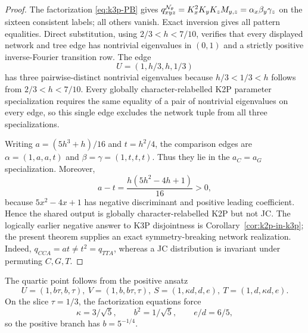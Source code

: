 \documentclass[11pt]{article}
\theoremstyle{remark}\newtheorem{remark}[theorem]{Remark}
\begin{document}
\begin{proof}
The factorization \eqref{eq:k3p-PB} gives $q^{\mathcal N_\theta}_{xyz}=K_x^2K_yK_zM_{y,z}=\alpha_x\beta_y\gamma_z$ on the sixteen consistent labels; all others vanish. Exact inversion gives all pattern equalities. Direct substitution, using $2/3<h<7/10$, verifies that every displayed network and tree edge has nontrivial eigenvalues in $(0,1)$ and a strictly positive inverse-Fourier transition row. The edge
\[
U=(1,h/3,h,1/3)
\]
has three pairwise-distinct nontrivial eigenvalues because $h/3<1/3<h$ follows from $2/3<h<7/10$. Every globally character-relabelled K2P parameter specialization requires the same equality of a pair of nontrivial eigenvalues on every edge, so this single edge excludes the network tuple from all three specializations.

Writing $a=(5h^3+h)/16$ and $t=h^2/4$, the comparison edges are $\alpha=(1,a,a,t)$ and $\beta=\gamma=(1,t,t,t)$. Thus they lie in the $a_C=a_G$ specialization. Moreover,
\[
a-t=\frac{h(5h^2-4h+1)}{16}>0,
\]
because $5x^2-4x+1$ has negative discriminant and positive leading coefficient. Hence the shared output is globally character-relabelled K2P but not JC. The logically earlier negative answer to K3P disjointness is Corollary~\ref{cor:k2p-in-k3p}; the present theorem supplies an exact symmetry-breaking network realization.
Indeed, $q_{CCA}=at\ne t^2=q_{TTA}$, whereas a JC distribution is invariant under permuting $C,G,T$.
\end{proof}
The quartic point follows from the positive ansatz
\[
U=(1,b\tau,b,\tau),\ V=(1,b,b\tau,\tau),\ S=(1,\kappa d,d,e),\ T=(1,d,\kappa d,e).
\]
On the slice $\tau=1/3$, the factorization equations force
\[
\kappa=3/\sqrt5,\qquad b^2=1/\sqrt5,\qquad e/d=6/5,
\]
so the positive branch has $b=5^{-1/4}$.
\end{document}
